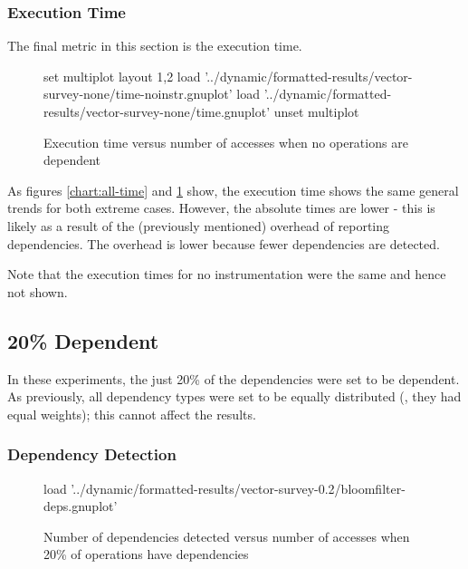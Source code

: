 		\subsubsection{Execution Time} \label{sec:results/none/time}
		The final metric in this section is the execution time.
		
		\begin{figure}
			\centering
			\begin{gnuplot}[terminal=pdf]
				set multiplot layout 1,2
					load '../dynamic/formatted-results/vector-survey-none/time-noinstr.gnuplot'		
					load '../dynamic/formatted-results/vector-survey-none/time.gnuplot'
				unset multiplot
			\end{gnuplot}
			\caption{Execution time versus number of accesses when no operations are dependent}
			\label{chart:none-time}
		\end{figure}
		
		As figures \ref{chart:all-time} and \ref{chart:none-time} show, the execution time shows the same general trends for both extreme cases. However, the absolute times are lower - this is likely as a result of the (previously mentioned) overhead of reporting dependencies. The overhead is lower because fewer dependencies are detected.
		
		Note that the execution times for no instrumentation were the same and hence not shown.
		
	\subsection{20\% Dependent} \label{sec:results/20}
		In these experiments, the just 20\% of the dependencies were set to be dependent. As previously, all dependency types were set to be equally distributed (\ie, they had equal weights); this cannot affect the results.
	
		\subsubsection{Dependency Detection} \label{sec:results/20/deps}
		\begin{figure}
			\centering
			\begin{gnuplot}[terminal=pdf]
				load '../dynamic/formatted-results/vector-survey-0.2/bloomfilter-deps.gnuplot'
			\end{gnuplot}
			\caption{Number of dependencies detected versus number of accesses when 20\% of operations have dependencies}
			\label{chart:20-dep}
		\end{figure}
		

